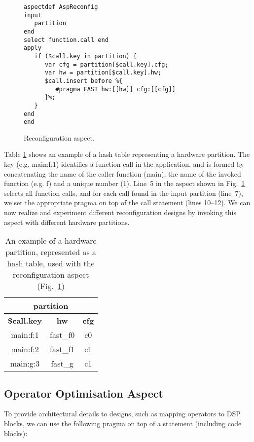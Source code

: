 \lstset{style=lara}
\begin{figure}[!h]
\begin{lstlisting}
aspectdef AspReconfig
input
   partition
end
select function.call end
apply
   if ($call.key in partition) {
      var cfg = partition[$call.key].cfg;
      var hw = partition[$call.key].hw;
      $call.insert before %{
         #pragma FAST hw:[[hw]] cfg:[[cfg]]
      }%;
   }
end
end
\end{lstlisting}
\caption{Reconfiguration aspect.}
\label{fig:aspect-reconf}
\end{figure}

Table \ref{fig:aspect-hash} shows an example of a hash table representing
a hardware partition. The key (e.g. main:f:1) identifies a function call in the application, and is
formed by concatenating the name of the caller function (main), the name of the invoked function (e.g. f) and a
unique number (1).  Line~5 in the aspect shown in Fig.~\ref{fig:aspect-reconf} selects all function calls,
and for each call found in the input partition (line~7), we set the
appropriate pragma on top of the call statement (lines 10--12). We can now realize and experiment
different reconfiguration designs by invoking this aspect with different hardware partitions.


\begin{table}[!h]
\caption{An example of a hardware partition, represented as a hash table, used with the reconfiguration aspect (Fig.~\ref{fig:aspect-reconf})}
\label{fig:aspect-hash}
\centering
\begin{tabular}{c|c|c}
\hline
\multicolumn{3}{c}{\bf{partition}} \\
\hline
\bf{\$call.key} & \bf{hw} & \bf{cfg}  \\
\hline
main:f:1 & fast\_f0 & c0 \\
main:f:2 & fast\_f1 & c1 \\
main:g:3 & fast\_g & c1 \\
\hline
\end{tabular}
\end{table}

\subsection{Operator Optimisation Aspect}
\label{sect:asp_ops}
To provide architectural details to \MAXC{} designs, such as mapping operators to DSP blocks, we can use the following \MAXC{} pragma on top of a statement (including code blocks):
\vspace{2mm}

